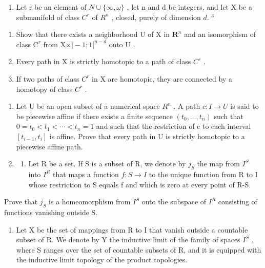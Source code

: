 \begin{enumerate}
\def\labelenumi{\arabic{enumi})}
\setcounter{enumi}{4}
\tightlist
\item
  Let r be an element of \(N \cup \{\infty, \omega\}\) , let n and d be integers, and let X be a submanifold of class \(C^{r}\) of \(R^{n}\) , closed, purely of dimension \(d\). \(^{3}\)
\end{enumerate}

\begin{enumerate}
\def\labelenumi{\alph{enumi})}
\item
  Show that there exists a neighborhood U of X in \(\mathbf{R}^n\) and an isomorphism of class \(\mathrm{C}^r\) from \(\mathrm{X} \times ] - 1; 1[^{n - d}\) onto \(\mathrm{U}\) .
\item
  Every path in X is strictly homotopic to a path of class \(C^{r}\) .
\item
  If two paths of class \(C^{r}\) in X are homotopic, they are connected by a homotopy of class \(C^{r}\) .
\end{enumerate}

\begin{enumerate}
\def\labelenumi{\arabic{enumi})}
\setcounter{enumi}{5}
\item
  Let U be an open subset of a numerical space \(R^{n}\) . A path \(c: I \to U\) is said to be piecewise affine if there exists a finite sequence \((t_{0}, \ldots, t_{n})\) such that \(0 = t_{0} < t_{1} < \cdots < t_{n} = 1\) and such that the restriction of c to each interval \([t_{i-1}, t_{i}]\) is affine. Prove that every path in U is strictly homotopic to a piecewise affine path.
\item
  \begin{enumerate}
  \def\labelenumii{\alph{enumii})}
  \tightlist
  \item
    Let R be a set. If S is a subset of R, we denote by \(j_{S}\) the map from \(I^{S}\) into \(I^{R}\) that maps a function \(f: S \to I\) to the unique function from R to I whose restriction to S equals f and which is zero at every point of R-S.
  \end{enumerate}
\end{enumerate}

Prove that \(j_{S}\) is a homeomorphism from \(I^{S}\) onto the subspace of \(I^{R}\) consisting of functions vanishing outside S.

\begin{enumerate}
\def\labelenumi{\alph{enumi})}
\setcounter{enumi}{1}
\tightlist
\item
  Let X be the set of mappings from R to I that vanish outside a countable subset of R. We denote by Y the inductive limit of the family of spaces \(I^{S}\) , where S ranges over the set of countable subsets of R, and it is equipped with the inductive limit topology of the product topologies.
\end{enumerate}

